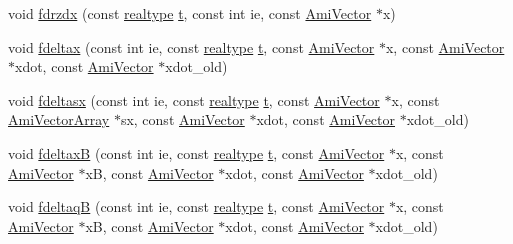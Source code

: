 \begin{DoxyCompactItemize}
\item 
void \mbox{\hyperlink{classamici_1_1_model_a2e4c45f13fbdf23c764b353ef336f7a3}{fdrzdx}} (const \mbox{\hyperlink{namespaceamici_a1bdce28051d6a53868f7ccbf5f2c14a3}{realtype}} \mbox{\hyperlink{classamici_1_1_model_a711281d57e9710226face29151cc4641}{t}}, const int ie, const \mbox{\hyperlink{classamici_1_1_ami_vector}{Ami\+Vector}} $\ast$x)
\item 
void \mbox{\hyperlink{classamici_1_1_model_a8e0cb4f4dd677822d0c33117e267f661}{fdeltax}} (const int ie, const \mbox{\hyperlink{namespaceamici_a1bdce28051d6a53868f7ccbf5f2c14a3}{realtype}} \mbox{\hyperlink{classamici_1_1_model_a711281d57e9710226face29151cc4641}{t}}, const \mbox{\hyperlink{classamici_1_1_ami_vector}{Ami\+Vector}} $\ast$x, const \mbox{\hyperlink{classamici_1_1_ami_vector}{Ami\+Vector}} $\ast$xdot, const \mbox{\hyperlink{classamici_1_1_ami_vector}{Ami\+Vector}} $\ast$xdot\+\_\+old)
\item 
void \mbox{\hyperlink{classamici_1_1_model_a685b7374d29d96f7d40d83c7d92fcf27}{fdeltasx}} (const int ie, const \mbox{\hyperlink{namespaceamici_a1bdce28051d6a53868f7ccbf5f2c14a3}{realtype}} \mbox{\hyperlink{classamici_1_1_model_a711281d57e9710226face29151cc4641}{t}}, const \mbox{\hyperlink{classamici_1_1_ami_vector}{Ami\+Vector}} $\ast$x, const \mbox{\hyperlink{classamici_1_1_ami_vector_array}{Ami\+Vector\+Array}} $\ast$sx, const \mbox{\hyperlink{classamici_1_1_ami_vector}{Ami\+Vector}} $\ast$xdot, const \mbox{\hyperlink{classamici_1_1_ami_vector}{Ami\+Vector}} $\ast$xdot\+\_\+old)
\item 
void \mbox{\hyperlink{classamici_1_1_model_a5542077fa03103e502349d92dc95f33a}{fdeltaxB}} (const int ie, const \mbox{\hyperlink{namespaceamici_a1bdce28051d6a53868f7ccbf5f2c14a3}{realtype}} \mbox{\hyperlink{classamici_1_1_model_a711281d57e9710226face29151cc4641}{t}}, const \mbox{\hyperlink{classamici_1_1_ami_vector}{Ami\+Vector}} $\ast$x, const \mbox{\hyperlink{classamici_1_1_ami_vector}{Ami\+Vector}} $\ast$xB, const \mbox{\hyperlink{classamici_1_1_ami_vector}{Ami\+Vector}} $\ast$xdot, const \mbox{\hyperlink{classamici_1_1_ami_vector}{Ami\+Vector}} $\ast$xdot\+\_\+old)
\item 
void \mbox{\hyperlink{classamici_1_1_model_aef4944ffd8a1b4f9a92ce1f8923af695}{fdeltaqB}} (const int ie, const \mbox{\hyperlink{namespaceamici_a1bdce28051d6a53868f7ccbf5f2c14a3}{realtype}} \mbox{\hyperlink{classamici_1_1_model_a711281d57e9710226face29151cc4641}{t}}, const \mbox{\hyperlink{classamici_1_1_ami_vector}{Ami\+Vector}} $\ast$x, const \mbox{\hyperlink{classamici_1_1_ami_vector}{Ami\+Vector}} $\ast$xB, const \mbox{\hyperlink{classamici_1_1_ami_vector}{Ami\+Vector}} $\ast$xdot, const \mbox{\hyperlink{classamici_1_1_ami_vector}{Ami\+Vector}} $\ast$xdot\+\_\+old)

\end{DoxyCompactItemize}
